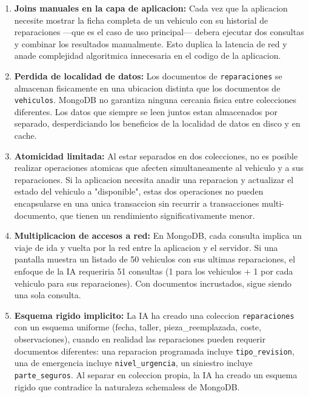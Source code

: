 \begin{enumerate}
    \item \textbf{Joins manuales en la capa de aplicacion:} Cada vez que la aplicacion necesite mostrar la ficha completa de un vehiculo con su historial de reparaciones ---que es el caso de uso principal--- debera ejecutar dos consultas y combinar los resultados manualmente. Esto duplica la latencia de red y anade complejidad algoritmica innecesaria en el codigo de la aplicacion.

    \item \textbf{Perdida de localidad de datos:} Los documentos de \texttt{reparaciones} se almacenan fisicamente en una ubicacion distinta que los documentos de \texttt{vehiculos}. MongoDB no garantiza ninguna cercania fisica entre colecciones diferentes. Los datos que siempre se leen juntos estan almacenados por separado, desperdiciando los beneficios de la localidad de datos en disco y en cache.

    \item \textbf{Atomicidad limitada:} Al estar separados en dos colecciones, no es posible realizar operaciones atomicas que afecten simultaneamente al vehiculo y a sus reparaciones. Si la aplicacion necesita anadir una reparacion y actualizar el estado del vehiculo a "disponible", estas dos operaciones no pueden encapsularse en una unica transaccion sin recurrir a transacciones multi-documento, que tienen un rendimiento significativamente menor.

    \item \textbf{Multiplicacion de accesos a red:} En MongoDB, cada consulta implica un viaje de ida y vuelta por la red entre la aplicacion y el servidor. Si una pantalla muestra un listado de 50 vehiculos con sus ultimas reparaciones, el enfoque de la IA requeriria 51 consultas (1 para los vehiculos + 1 por cada vehiculo para sus reparaciones). Con documentos incrustados, sigue siendo una sola consulta.

    \item \textbf{Esquema rigido implicito:} La IA ha creado una coleccion \texttt{reparaciones} con un esquema uniforme (fecha, taller, pieza\_reemplazada, coste, observaciones), cuando en realidad las reparaciones pueden requerir documentos diferentes: una reparacion programada incluye \texttt{tipo\_revision}, una de emergencia incluye \texttt{nivel\_urgencia}, un siniestro incluye \texttt{parte\_seguros}. Al separar en coleccion propia, la IA ha creado un esquema rigido que contradice la naturaleza schemaless de MongoDB.

\end{enumerate}


